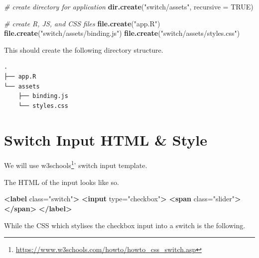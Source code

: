 \documentclass[
]{krantz}
\makeatletter
\newenvironment{Shaded}{\begin{snugshade}}{\end{snugshade}}
\newcommand{\CommentTok}[1]{\textcolor[rgb]{0.37,0.37,0.37}{\textit{#1}}}
\newcommand{\DataTypeTok}[1]{\textcolor[rgb]{0.27,0.27,0.27}{#1}}
\newcommand{\KeywordTok}[1]{\textcolor[rgb]{0.27,0.27,0.27}{\textbf{#1}}}
\newcommand{\NormalTok}[1]{#1}
\newcommand{\OtherTok}[1]{\textcolor[rgb]{0.37,0.37,0.37}{#1}}
\newcommand{\StringTok}[1]{\textcolor[rgb]{0.5,0.5,0.5}{#1}}
\renewcommand{\href}[2]{#2\footnote{\url{#1}}}
\newenvironment{kframe}{%
\medskip{}
\setlength{\fboxsep}{.8em}
 \def\at@end@of@kframe{}%
 \ifinner\ifhmode%
  \def\at@end@of@kframe{\end{minipage}}%
  \begin{minipage}{\columnwidth}%
 \fi\fi%
 \def\FrameCommand##1{\hskip\@totalleftmargin \hskip-\fboxsep
 \colorbox{shadecolor}{##1}\hskip-\fboxsep
     \hskip-\linewidth \hskip-\@totalleftmargin \hskip\columnwidth}%
 \MakeFramed {\advance\hsize-\width
   \@totalleftmargin\z@ \linewidth\hsize
   \@setminipage}}%
 {\par\unskip\endMakeFramed%
 \at@end@of@kframe}
\renewenvironment{Shaded}{\begin{kframe}}{\end{kframe}}
\makeatother
\begin{document}
\begin{Shaded}
\begin{Highlighting}[]
\CommentTok{\# create directory for application}
\KeywordTok{dir.create}\NormalTok{(}\StringTok{"switch/assets"}\NormalTok{, }\DataTypeTok{recursive =} \OtherTok{TRUE}\NormalTok{)}

\CommentTok{\# create R, JS, and CSS files}
\KeywordTok{file.create}\NormalTok{(}\StringTok{"app.R"}\NormalTok{)}
\KeywordTok{file.create}\NormalTok{(}\StringTok{"switch/assets/binding.js"}\NormalTok{)}
\KeywordTok{file.create}\NormalTok{(}\StringTok{"switch/assets/styles.css"}\NormalTok{)}
\end{Highlighting}
\end{Shaded}

This should create the following directory structure.

\begin{verbatim}
.
├── app.R
└── assets
    ├── binding.js
    └── styles.css
\end{verbatim}

\hypertarget{shiny-input-intro}{%
\section{Switch Input HTML \& Style}\label{shiny-input-intro}}

We will use \href{https://www.w3schools.com/howto/howto_css_switch.asp}{w3schools}' switch input template.

The HTML of the input looks like so.

\begin{Shaded}
\begin{Highlighting}[]
\KeywordTok{\textless{}label}\OtherTok{ class=}\StringTok{"switch"}\KeywordTok{\textgreater{}}
  \KeywordTok{\textless{}input}\OtherTok{ type=}\StringTok{"checkbox"}\KeywordTok{\textgreater{}}
  \KeywordTok{\textless{}span}\OtherTok{ class=}\StringTok{"slider"}\KeywordTok{\textgreater{}\textless{}/span\textgreater{}}
\KeywordTok{\textless{}/label\textgreater{}}
\end{Highlighting}
\end{Shaded}

While the CSS which stylises the checkbox input into a switch is the following.
\end{document}
